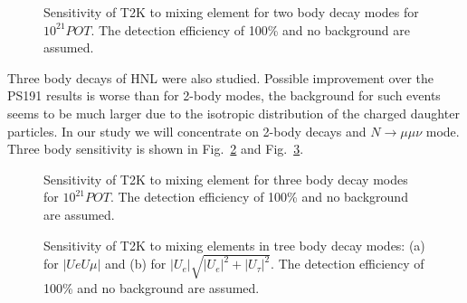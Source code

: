 \documentclass[../main.tex]{subfiles}
\begin{document}
\begin{figure}[!ht]
    \caption{Sensitivity of T2K to mixing element for two body decay modes for $10^{21}POT$. The detection efficiency of 100\% and no background are assumed.}
    \label{fig:HNL:UeUmuTwoBody}
\end{figure}

Three body decays of HNL were also studied. Possible improvement over the PS191 results is worse than for 2-body modes, the background for such events seems to be much larger due to the isotropic distribution of the charged daughter particles. In our study we will concentrate on 2-body decays and $N\to\mu\mu\nu$ mode. Three body sensitivity is shown in Fig.~\ref{fig:HNL:TreeBodyFirst} and Fig.~\ref{fig:HNL:ThreeBodySecond}.

\begin{figure}[!ht]
    \begin{minipage}[!ht]{0.49\linewidth}
    \end{minipage}
    \hfill
    \begin{minipage}[!ht]{0.49\linewidth}
    \end{minipage}
    \caption{Sensitivity of T2K to mixing element for three body decay modes for $10^{21}POT$. The detection efficiency of 100\% and no background are assumed.}
    \label{fig:HNL:TreeBodyFirst}
\end{figure}

\begin{figure}[!ht]
    \begin{minipage}[!ht]{0.49\linewidth}
    \end{minipage}
    \hfill
    \begin{minipage}[!ht]{0.49\linewidth}
    \end{minipage}
    \caption{Sensitivity of T2K to mixing elements in tree body decay modes: (a) for $\left|UeU\mu\right|$ and (b) for $\left|U_{e}\right|\sqrt{\left|U_{e}\right|^2+\left|U_{\tau}\right|^2}$. The detection efficiency of 100\% and no background are assumed.}
    \label{fig:HNL:ThreeBodySecond}
\end{figure}
\end{document}
